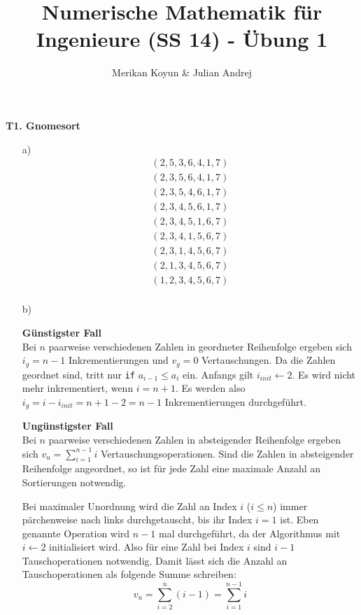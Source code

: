 \documentclass[11pt]{article}
\theoremstyle{plain}
\theoremstyle{definition}
\renewcommand{\a}{\"{a}}
\renewcommand{\u}{\"{u}}
\begin{document}
\title{Numerische Mathematik f\u r Ingenieure (SS 14) - \"{U}bung 1}
\author{Merikan Koyun \& Julian Andrej}
\maketitle

\textbf{T1. Gnomesort}\\
\begin{itemize}
\item[a)]
\begin{align*}
(2, 5, 3, 6, 4, 1, 7)\\
(2, 3, 5, 6, 4, 1, 7)\\
(2, 3, 5, 4, 6, 1, 7)\\
(2, 3, 4, 5, 6, 1, 7)\\
(2, 3, 4, 5, 1, 6, 7)\\
(2, 3, 4, 1, 5, 6, 7)\\
(2, 3, 1, 4, 5, 6, 7)\\
(2, 1, 3, 4, 5, 6, 7)\\
(1, 2, 3, 4, 5, 6, 7)\\
\end{align*}


\item[b)]

\textbf{G\u nstigster Fall}\\
Bei $n$ paarweise verschiedenen Zahlen in geordneter Reihenfolge ergeben sich $i_g = n-1$ Inkrementierungen und $v_g=0$ Vertauschungen. Da die Zahlen geordnet sind, tritt nur \verb!if! $a_{i-1}\leq a_i$ ein. Anfangs gilt $i_{init}\leftarrow 2$. Es wird nicht mehr inkrementiert, wenn $i=n+1$. Es werden also $ i_g= i - i_{init}= n+1-2 = n-1$ Inkrementierungen durchgef\u hrt.\vspace{0.3cm}

\textbf{Ung\u nstigster Fall}\\
Bei $n$ paarweise verschiedenen Zahlen in absteigender Reihenfolge ergeben sich $v_u=\sum_{i=1}^{n-1} i$ Vertauschungsoperationen.
Sind die Zahlen in absteigender Reihenfolge angeordnet, so ist f\u r jede Zahl eine maximale Anzahl an Sortierungen notwendig.

Bei maximaler Unordnung wird die Zahl an Index $i$ ($i\leq n$) immer p\a rchenweise nach links durchgetauscht, bis ihr Index $i=1$ ist. Eben genannte Operation wird $n-1$ mal durchgef\u hrt, da der Algorithmus mit $i \leftarrow 2$ initialisiert wird. Also f\u r eine Zahl bei Index $i$ sind $i-1$ Tauschoperationen notwendig. Damit l\a sst sich die Anzahl an Tauschoperationen als folgende Summe schreiben:
\begin{equation}
v_u = \sum_{i=2}^{n} (i-1) = \sum_{i=1}^{n-1} i
\end{equation}\vspace{0.3cm}


\end{itemize}
\end{document}
